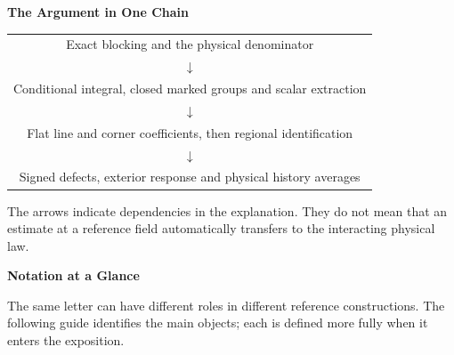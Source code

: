 \documentclass[11pt,a4paper]{article}
\newcommand{\subhead}[1]{\par\vspace{4pt}\textbf{\color{ink}#1}\par}
\begin{document}
\vspace{10pt}
\subhead{The Argument in One Chain}
\begin{center}
    \begin{tabular}{c}
        Exact blocking and the physical denominator\\
        $\downarrow$\\
        Conditional integral, closed marked groups and scalar extraction\\
        $\downarrow$\\
        Flat line and corner coefficients, then regional identification\\
        $\downarrow$\\
        Signed defects, exterior response and physical history averages
    \end{tabular}
\end{center}
The arrows indicate dependencies in the explanation. They do not mean that an estimate at a reference field automatically transfers to the interacting physical law.

\clearpage
{}
{\LARGE\bfseries\color{ink}Notation at a Glance\par}
\vspace{8pt}
The same letter can have different roles in different reference constructions. The following guide identifies the main objects; each is defined more fully when it enters the exposition.
\end{document}

